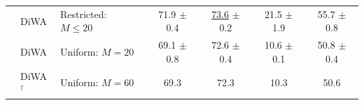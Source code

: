 \begin{table}[h]
{\begin{tabular}{lll|cccc}
                                                       & DiWA                             & Restricted: $M \leq 20$   & 71.9 $\pm$ 0.4             & \underline{73.6} $\pm$ 0.2 & 21.5 $\pm$ 1.9             & 55.7 $\pm$ 0.8              \\
                                                       & DiWA                             & Uniform: $M=20$           & 69.1 $\pm$ 0.8             & 72.6 $\pm$ 0.4             & 10.6 $\pm$ 0.1             & 50.8 $\pm$ 0.4              \\
                                                       & DiWA$^{\dagger}$                 & Uniform: $M=60$           & 69.3                       & 72.3                       & 10.3                       & 50.6                        \\
            \bottomrule
        \end{tabular}}
    \label{table:db_cmnist}%
\end{table}

